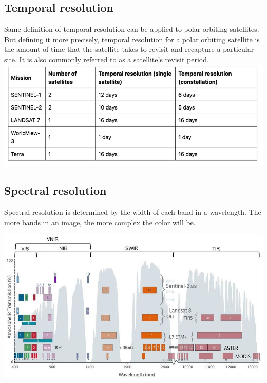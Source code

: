 \documentclass[
]{book}
\begin{document}
\hypertarget{temporal-resolution}{%
\subsection{\texorpdfstring{\textbf{Temporal resolution}\\
}{Temporal resolution }}\label{temporal-resolution}}

Same definition of temporal resolution can be applied to polar orbiting satellites. But defining it more precisely, temporal resolution for a polar orbiting satellite is the amount of time that the satellite takes to revisit and recapture a particular site. It is also commonly referred to as a satellite's revisit period.
\includegraphics{images/temporal-resolution.png}

\hypertarget{spectral-resolution}{%
\subsection{\texorpdfstring{\textbf{Spectral resolution}\\
}{Spectral resolution }}\label{spectral-resolution}}

Spectral resolution is determined by the width of each band in a wavelength. The more bands in an image, the more complex the color will be.

\includegraphics{images/Spectral-resolution.png}\\
\end{document}
